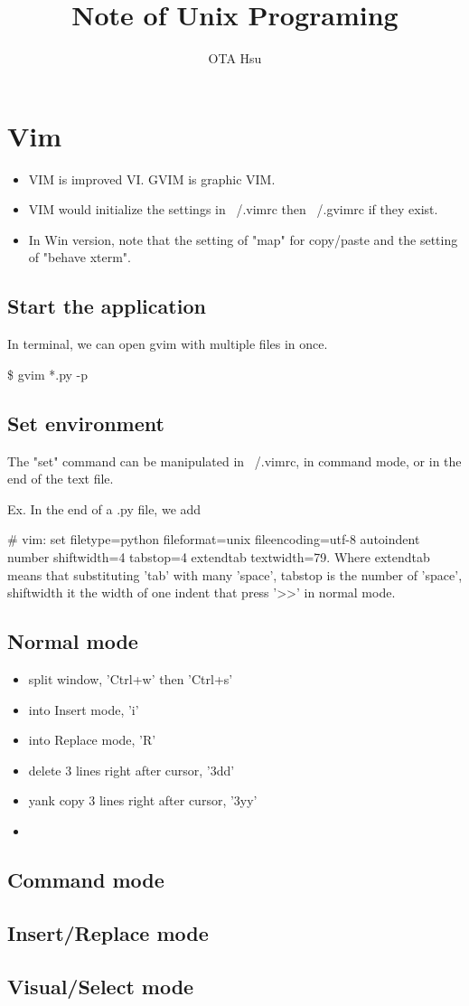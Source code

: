 \documentclass[12pt,a4paper]{article}
\title{Note of Unix Programing}
\author{OTA Hsu}
\begin{document}
\maketitle
    \section{Vim}
        \begin{itemize}
        \item
        VIM is improved VI. GVIM is graphic VIM.
        \item
        VIM would initialize the settings in ~/.vimrc then ~/.gvimrc if they
        exist.
        \item
        In Win version, note that the setting of "map" for copy/paste and
        the setting of "behave xterm". 
        \end{itemize}
        \subsection{Start the application}
        In terminal, we can open gvim with multiple files in once.
        
        \$ gvim *.py -p
        \subsection{Set environment}
        The "set" command can be manipulated in ~/.vimrc, in command mode,
        or in the end of the text file.
        
        Ex. In the end of a .py file, we add 
        
        \# vim: set filetype=python fileformat=unix fileencoding=utf-8
        autoindent number shiftwidth=4 tabstop=4 extendtab textwidth=79.
        Where extendtab means that substituting 'tab' with many 'space',
        tabstop is the number of 'space', shiftwidth it the width of one
        indent that press '>>' in normal mode.
        \subsection{Normal mode}
        \begin{itemize}
        \item
        split window, 'Ctrl+w' then 'Ctrl+s'
        \item
        into Insert mode, 'i'
        \item
        into Replace mode, 'R'
        \item
        delete 3 lines right after cursor, '3dd'
        \item 
        yank copy 3 lines right after cursor, '3yy'
        \item
        \end{itemize}
        \subsection{Command mode}
        \subsection{Insert/Replace mode}
        \subsection{Visual/Select mode}
\end{document}
